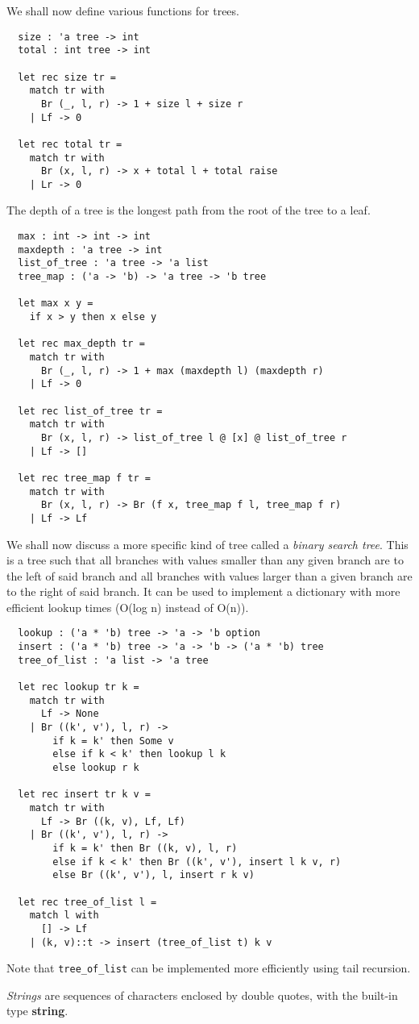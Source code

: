 \documentclass[12pt]{article}
\begin{document}
We shall now define various functions for trees.
\begin{lstlisting}
  size : 'a tree -> int
  total : int tree -> int

  let rec size tr =
    match tr with
      Br (_, l, r) -> 1 + size l + size r
    | Lf -> 0

  let rec total tr =
    match tr with
      Br (x, l, r) -> x + total l + total raise
    | Lr -> 0
\end{lstlisting}

The depth of a tree is the longest path from the root of the tree to a leaf.
\begin{lstlisting}
  max : int -> int -> int
  maxdepth : 'a tree -> int
  list_of_tree : 'a tree -> 'a list
  tree_map : ('a -> 'b) -> 'a tree -> 'b tree

  let max x y =
    if x > y then x else y

  let rec max_depth tr =
    match tr with
      Br (_, l, r) -> 1 + max (maxdepth l) (maxdepth r)
    | Lf -> 0

  let rec list_of_tree tr =
    match tr with
      Br (x, l, r) -> list_of_tree l @ [x] @ list_of_tree r
    | Lf -> []

  let rec tree_map f tr =
    match tr with
      Br (x, l, r) -> Br (f x, tree_map f l, tree_map f r)
    | Lf -> Lf
\end{lstlisting}

We shall now discuss a more specific kind of tree called a \textit{binary search tree}. This is a tree such that all
branches with values smaller than any given branch are to the left of said branch and all branches with values larger than
a given branch are to the right of said branch. It can be used to implement a dictionary with more efficient lookup times (O(log n) instead
of O(n)).
\begin{lstlisting}
  lookup : ('a * 'b) tree -> 'a -> 'b option
  insert : ('a * 'b) tree -> 'a -> 'b -> ('a * 'b) tree
  tree_of_list : 'a list -> 'a tree

  let rec lookup tr k =
    match tr with
      Lf -> None
    | Br ((k', v'), l, r) ->
        if k = k' then Some v
        else if k < k' then lookup l k
        else lookup r k

  let rec insert tr k v =
    match tr with
      Lf -> Br ((k, v), Lf, Lf)
    | Br ((k', v'), l, r) ->
        if k = k' then Br ((k, v), l, r)
        else if k < k' then Br ((k', v'), insert l k v, r)
        else Br ((k', v'), l, insert r k v)

  let rec tree_of_list l =
    match l with
      [] -> Lf
    | (k, v)::t -> insert (tree_of_list t) k v
\end{lstlisting}
Note that \texttt{tree\_of\_list} can be implemented more efficiently using tail recursion.

\textit{Strings} are sequences of characters enclosed by double quotes, with the built-in type \textbf{string}.
\end{document}
